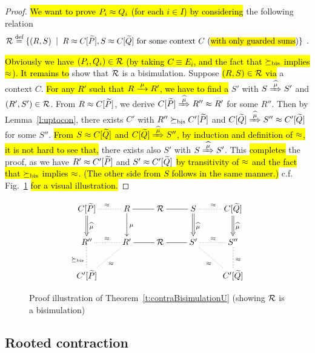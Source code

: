 \begin{proof}
\hl{We want to prove $P_i \approx Q_i$ (for each $i \in I$) by considering} the following relation
\begin{equation*}
\R \DSdefi \{(R,S) \st R \wb \ct{\til P}, S \wb \ct{\til Q} \mbox{~for some context
$\qct$ (\hl{with only guarded sums})} \} \enspace.
\end{equation*}

\hl{Obviously we have $(P_i,Q_i) \in {\cal R}$ (by taking $C \equiv E_i$, and
the fact that $\mathrel{\succeq_{\rm{bis}}}$ implies $\approx$). It remains to}
show that ${\cal R}$ is a bisimulation. Suppose \hl{$(R, S) \in {\cal R}$ via} a context
$C$. \hl{For any $R'$ such that $R \arr{\mu} R'$, we have to find a} $S'$ with $S \Arcap{\mu}
S'$ and $(R', S') \in {\cal R}$. From $R \approx C[{\widetilde P}]$, we derive $C[{\til P}]
\Arcap{\mu} R'' \wb R'$ for some $R''$. Then by Lemma~\ref{l:uptocon},
there exists $C'$ with $R'' \mathrel{\succeq_{\rm{bis}}} C'[{\widetilde P}]$ and $C[{\til Q}]
\Arcap{\mu} S'' \wb C'[{\til Q}]$ for some $S''$. \hl{From $S \approx C[{\widetilde
  Q}]$ and $C[{\til Q}] \Arcap{\mu} S''$, by induction and definition of $\approx$, it is not
hard to see that,}
there exists also $S'$ with $S \Arcap{\mu} S'$. This \hl{completes} the
proof, as we have $R' \approx C'[{\widetilde P}]$ and $S' \approx C'[{\widetilde Q}]$ \hl{by
transitivity of $\approx$ and the fact that $\mathrel{\succeq_{\rm{bis}}}$ implies $\approx$.
(The other side from $S$ follows in the same manner.)}
c.f. Fig.~\ref{fig:310} \hl{for a visual illustration.}
\end{proof}

\begin{figure}[ht]
\begin{displaymath}
  \xymatrix{
    {C[{\til P}]} \ar@{.}[r]^{\wb} \ar@{=>}[d]^{\widehat{\mu}} & {R} \ar@{-}[r]
    \ar@{->}[d]^{\mu} & {\R} \ar@{-}[r] & {S} \ar@{.}[r]^{\wb}
    \ar@{=>}[d]^{\widehat{\mu}} & {C[{\til Q}]} \ar@{=>}[d]^{\widehat{\mu}} \\
    {R''} \ar@{.}[d]_{\mcontrBIS} \ar@{.}[r]^{\wb} & {R'} \ar@{-}[r]
    \ar@{.}[ld]^{\wb} & {\R} \ar@{-}[r] & {S'} \ar@{.}[r]^{\wb} \ar@{.}[rd]_{\wb}
    & {S''} \ar@{.}[d]^{\wb} \\
    {C'[{\til P}]} & {} & {} & {} & {C'[{\til Q}]}
  }
\end{displaymath}
\caption{Proof illustration of Theorem~\ref{t:contraBisimulationU}
  (showing ${\cal R}$ is a bisimulation)}
\label{fig:310}
\end{figure}

\subsection{Rooted contraction}
\label{ss:new}

